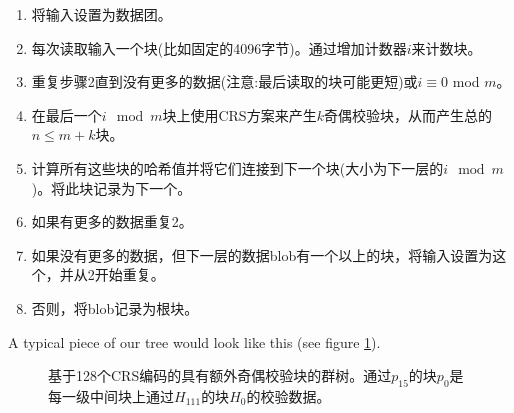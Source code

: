 \begin{enumerate}
\item 将输入设置为数据团。
\item 每次读取输入一个块(比如固定的4096字节)。通过增加计数器$i$来计数块。 
\item 重复步骤2直到没有更多的数据(注意:最后读取的块可能更短)或$i \equiv 0$ mod $m$。
\item 在最后一个$i \mod m$块上使用CRS方案来产生$k$奇偶校验块，从而产生总的$n \leq m+k$块。
\item 计算所有这些块的哈希值并将它们连接到下一个块(大小为下一层的$i\mod m$)。将此块记录为下一个。
\item 如果有更多的数据重复2。 
\item 如果没有更多的数据，但下一层的数据blob有一个以上的块，将输入设置为这个，并从2开始重复。
\item 否则，将blob记录为根块。
\end{enumerate}


A typical piece of our tree would look like this (see figure \ref{fig:Swarm-hash-erasure}).


\begin{figure}[htbp]
   \centering
   \resizebox{1\textwidth}{!}{
        
   }
   \caption[群哈希擦除\statusgreen]{基于128个CRS编码的具有额外奇偶校验块的群树。通过$p_{15}$的块$p_{0}$是每一级中间块上通过$H_{111}$的块$H_0 $的校验数据。}
   \label{fig:Swarm-hash-erasure}
\end{figure}


